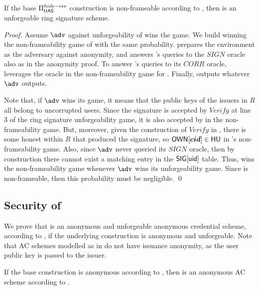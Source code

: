 \begin{theorem}
  If the base $\Pi_{\mathsf{UAS}}^{hide-iss}$ construction is non-frameable according to
  , then \CUASRing is an unforgeable ring signature
  scheme.
\end{theorem}

\begin{proof}
  Assume $\adv$ against unforgeability of \CUASRing wins the game. We build
  \advB winning the non-frameability game of \CUASGen with the same probability.
  \advB prepares the environment as the adversary \advB against anonymity,
  and answers \adv's queries to the $SIGN$ oracle also as in the anonymity
  proof. To answer \adv's queries to its $CORR$ oracle, \advB leverages the
  \ICORR oracle in the non-frameability game for \UAS. Finally, \advB outputs
  whatever $\adv$ outputs.

  Note that, if $\adv$ wins its game, it means that the public keys of the
  issuers in $R$ all belong to uncorrupted users. Since the signature is
  accepted by $Verify$ at line 3 of the ring signature unforgeability game,
  it is also accepted by \Verify in the \UAS non-frameability game. But,
  moreover, given the construction of $Verify$ in \CUASRing, there is some
  honest \usk within $R$ that produced the signature, so $\mathsf{OWN}[\boldsymbol{cid}] \in \mathsf{HU}$
  in \advB's non-frameability game. Also, since $\adv$ never queried its $SIGN$
  oracle, then by construction there cannot exist a matching entry in the
  $\mathsf{SIG}[\mathsf{uid}]$ table. Thus, \advB wins the non-frameability game whenever
  $\adv$ wins its unforgeability game. Since \CUASGen is non-frameable, then
  this probability must be negligible.
  \qed
\end{proof}

\subsection{Security of \CUASAC}

We prove that \CUASAC is an anonymous and unforgeable anonymous credential
scheme, according to \cite{fhs19}, if the underlying \CUASGen construction
is anonymous and unforgeable. Note that AC schemes modelled as in \cite{fhs19}
do not have issuance anonymity, as the user public key is passed to the issuer.

\begin{theorem}
  \label{thm:anon-cuasac}
  If the base \CUASGen construction is anonymous according to
  , then \CUASAC is an anonymous AC scheme according
  to \cite{fhs19}.
\end{theorem}

